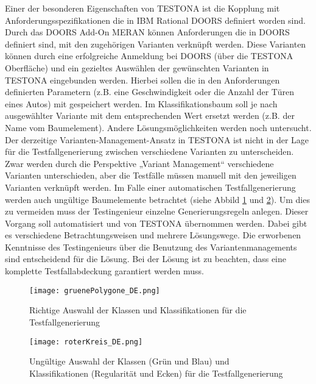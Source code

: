 Einer der besonderen Eigenschaften von TESTONA ist die Kopplung mit Anforderungsspezifikationen die in IBM Rational DOORS definiert worden sind. Durch das DOORS Add-On MERAN können Anforderungen die in DOORS definiert sind, mit den zugehörigen Varianten verknüpft werden. Diese Varianten können durch eine erfolgreiche Anmeldung bei DOORS (über die TESTONA Oberfläche) und ein gezieltes Auswählen der gewünschten Varianten in TESTONA eingebunden werden. Hierbei sollen die in den Anforderungen definierten Parametern (z.B. eine Geschwindigkeit oder die Anzahl der Türen eines Autos) mit gespeichert werden. Im Klassifikationsbaum soll je nach ausgewählter Variante mit dem entsprechenden Wert ersetzt werden (z.B. der Name vom Baumelement). Andere Lösungsmöglichkeiten werden noch untersucht.\\

Der derzeitige Varianten-Management-Ansatz in TESTONA ist nicht in der Lage für die Testfallgenerierung zwischen verschiedene Varianten zu unterscheiden. Zwar werden durch die Perspektive „Variant Management“ verschiedene Varianten unterschieden, aber die Testfälle müssen manuell mit den jeweiligen Varianten verknüpft werden. Im Falle einer automatischen Testfallgenerierung werden auch ungültige Baumelemente betrachtet (siehe Abbild \ref{ttn.gruen} und \ref{ttn.rot}). Um dies zu vermeiden muss der Testingenieur einzelne Generierungsregeln anlegen. Dieser Vorgang soll automatisiert und von TESTONA übernommen werden. Dabei gibt es verschiedene Betrachtungsweisen und mehrere Lösungswege. Die erworbenen Kenntnisse des Testingenieurs über die Benutzung des Variantenmanagements sind entscheidend für die Lösung. Bei der Lösung ist zu beachten, dass eine komplette Testfallabdeckung garantiert werden muss.\\


\begin{figure}[h]
  \begin{center}
    \texttt{[image: gruenePolygone\_DE.png]}
  		  \caption{Richtige Auswahl der Klassen und Klassifikationen für die Testfallgenerierung}
     \label{ttn.gruen}
  \end{center}
\end{figure}


\begin{figure}[h]
  \begin{center}
    \texttt{[image: roterKreis\_DE.png]}
  		  \caption{Ungültige Auswahl der Klassen (Grün und Blau) und Klassifikationen (Regularität und Ecken) für die Testfallgenerierung}
     \label{ttn.rot}
  \end{center}
\end{figure}



